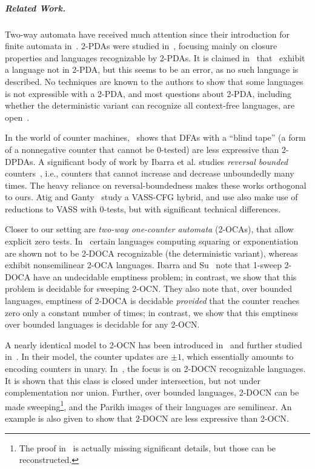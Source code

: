 \documentclass[USenglish]{lipics-v2021}
\begin{document}
	\subparagraph*{Related Work.} Two-way automata have received much attention since
	their introduction for finite automata in~\cite{rabin1959finite}. 2-PDAs were
	studied
	in~\cite{martin1973two,gray1967two,arikawa1968some,monien1984deterministic},
	focusing mainly on closure properties and languages recognizable by 2-PDAs.  It
	is claimed in~\cite{arikawa1968some} that~\cite{gray1967two} exhibit a language
	not in 2-PDA, but this seems to be an error, as no such language is described.
	No techniques are known to the authors to show that some languages is not
	expressible with a 2-PDA, and most questions about 2-PDA, including whether the
	deterministic variant can recognize all context-free languages, are
	open~\cite{galil1976some}.
	
	In the world of counter machines,~\cite{duris1982fooling} shows that DFAs with a
	``blind tape'' (a form of a nonnegative counter that cannot be 0-tested) are
	less expressive than 2-DPDAs.  A significant body of work by Ibarra et
	al. studies \emph{reversal bounded}
	counters~\cite{ibarra1993equivalence,ibarra1999counter,ibarra2004two,dang2005two,ibarra1995new},
	i.e., counters that cannot increase and decrease unboundedly many times. The heavy reliance
	on reversal-boundedness makes these works orthogonal to ours. Atig and Ganty~\cite{atig2011approximating} study a VASS-CFG hybrid, and use also make use of reductions to VASS with 0-tests, but with significant technical differences.
	
	Closer to our setting are \emph{two-way one-counter automata} (2-OCAs), that
	allow explicit zero tests. In~\cite{petersen1994two} certain languages computing
	squaring or exponentiation are shown not to be 2-DOCA recognizable (the
	deterministic variant), whereas~\cite{de2014unary} exhibit nonsemilinear 2-OCA
	languages.  Ibarra and Su~\cite{ibarra1999counter} note that 1-sweep 2-DOCA have
	an undecidable emptiness problem; in contrast, we show that this problem is
	decidable for sweeping 2-OCN.  They also note that, over bounded languages,
	emptiness of 2-DOCA is decidable \emph{provided} that the counter reaches zero
	only a constant number of times; in contrast, we show that this emptiness over
	bounded languages is decidable for any 2-OCN. 
	
	A nearly identical model to 2-OCN has been introduced in~\cite{miyano1982two} and further studied in~\cite{chan1987two}. In their model, the counter updates are $\pm 1$, which essentially amounts to encoding counters in unary.
	In~\cite{miyano1982two}, the focus is on 2-DOCN recognizable languages. It is shown that this class is closed under intersection, but not under complementation nor union. Further, over bounded languages, 2-DOCN can be made sweeping\footnote{The proof in~\cite{miyano1982two} is actually missing significant details, but those can be reconstructed.}, and the Parikh images of their languages are semilinear. 
	An example is also given to show that 2-DOCN are less expressive than 2-OCN.
	
\end{document}

